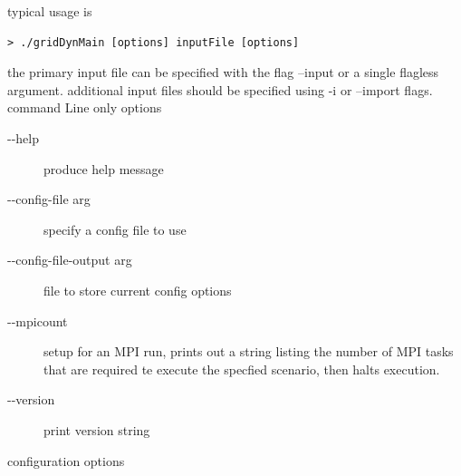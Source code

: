 \documentclass[12pt]{article} %
\begin{document}
typical usage is 
\begin{verbatim}
> ./gridDynMain [options] inputFile [options]
\end{verbatim}
the primary input file can be specified with the flag --input or a single flagless argument.  additional input files should be specified using -i or --import flags.  
command Line only options
\begin{description}
	
	\item [-{}-help]                  produce help message
	\item [-{}-config-file arg]        specify a config file to use
	\item [-{}-config-file-output arg] file to store current config options
	\item [-{}-mpicount ]              setup for an MPI run, prints out a string listing the number of MPI tasks that are required te execute the specfied scenario,  then halts execution.  
	\item [-{}-version]                print version string
	\end{description}
	configuration options
\end{document}
